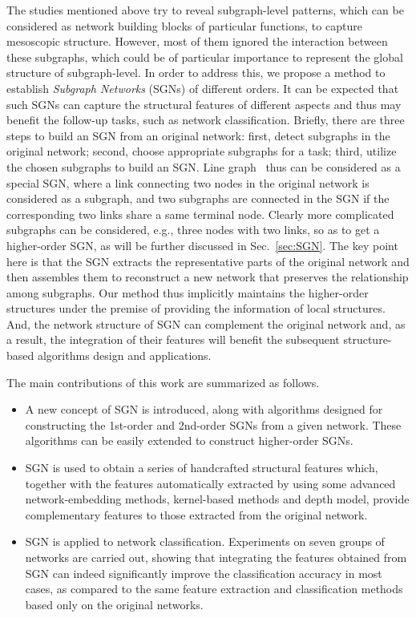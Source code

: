 \documentclass[10pt,journal,compsoc]{IEEEtran}
\begin{document}
The studies mentioned above try to reveal subgraph-level patterns, which can be considered as network building blocks of particular functions, to capture mesoscopic structure. However, most of them ignored the interaction between these subgraphs, which could be of particular importance to represent the global structure of subgraph-level. In order to address this, we propose a method to establish \emph{Subgraph Networks} (SGNs) of different orders. It can be expected that such SGNs can capture the structural features of different aspects and thus may benefit the follow-up tasks, such as network classification. Briefly, there are three steps to build an SGN from an original network: first, detect subgraphs in the original network; second, choose appropriate subgraphs for a task; third, utilize the chosen subgraphs to build an SGN. Line graph~\cite{harary1960some} thus can be considered as a special SGN, where a link connecting two nodes in the original network is considered as a subgraph, and two subgraphs are connected in the SGN if the corresponding two links share a same terminal node. Clearly more complicated subgraphs can be considered, e.g., three nodes with two links, so as to get a higher-order SGN, as will be further discussed in Sec.~\ref{sec:SGN}. The key point here is that the SGN extracts the representative parts of the original network and then assembles them to reconstruct a new network that preserves the relationship among subgraphs. Our method thus implicitly maintains the higher-order structures under the premise of providing the information of local structures. And, the network structure of SGN can complement the original network and, as a result, the integration of their features will benefit the subsequent structure-based algorithms design and applications.

The main contributions of this work are summarized as follows.

\begin{itemize}
\item A new concept of SGN is introduced, along with algorithms designed for constructing the 1st-order and 2nd-order SGNs from a given network. These algorithms can be easily extended to construct higher-order SGNs.
\item SGN is used to obtain a series of handcrafted structural features which, together with the features automatically extracted by using some advanced network-embedding methods, kernel-based methods and depth model, provide complementary features to those extracted from the original network.
\item SGN is applied to network classification. Experiments on seven groups of networks are carried out, showing that integrating the features obtained from SGN can indeed significantly improve the classification accuracy in most cases, as compared to the same feature extraction and classification methods based only on the original networks.
\end{itemize}
\end{document}

